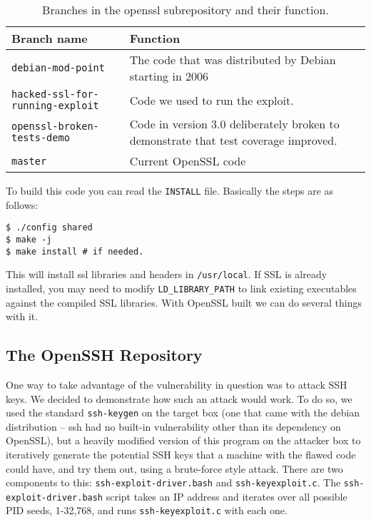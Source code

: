 \documentclass[conference]{IEEEtran}
\begin{document}
\begin{table*}[!t]
  \centering
  \begin{tabular}{|l|l|}
    \hline
    Branch name & Function \\ \hline
    \verb|debian-mod-point| & The code that was distributed by Debian starting in 2006 \\ \hline
    \verb|hacked-ssl-for-running-exploit| & Code we used to run the exploit. \\ \hline
    \verb|openssl-broken-tests-demo| & Code in version 3.0 deliberately broken to demonstrate that test coverage improved. \\ \hline
    \verb|master| & Current OpenSSL code \\ \hline
  \end{tabular}
  \caption{Branches in the openssl subrepository and their function.}
  \label{branches}
\end{table*}

To build this code you can read the \verb|INSTALL| file. Basically the
steps are as follows:

\begin{verbatim}
$ ./config shared
$ make -j
$ make install # if needed.
\end{verbatim}

This will install ssl libraries and headers in \verb|/usr/local|. If
SSL is already installed, you may need to modify
\verb|LD_LIBRARY_PATH| to link existing executables against the
compiled SSL libraries.  With OpenSSL built we can do several things
with it.

\subsection{The OpenSSH Repository}
One way to take advantage of the vulnerability in question was to
attack SSH keys. We decided to demonstrate how such an attack would
work. To do so, we used the standard \verb|ssh-keygen| on the target
box (one that came with the debian distribution -- ssh had no built-in
vulnerability other than its dependency on OpenSSL), but a heavily
modified version of this program on the attacker box to iteratively
generate the potential SSH keys that a machine with the flawed code
could have, and try them out, using a brute-force style attack. There
are two components to this: \verb|ssh-exploit-driver.bash| and
\verb|ssh-keyexploit.c|. The \verb|ssh-exploit-driver.bash| script
takes an IP address and iterates over all possible PID seeds,
1-32,768, and runs \verb|ssh-keyexploit.c| with each one.
\end{document}
